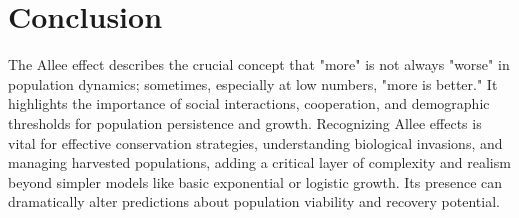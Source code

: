 \documentclass{article}
\begin{document}
\section{Conclusion}

The Allee effect describes the crucial concept that "more" is not always "worse" in population dynamics; sometimes, especially at low numbers, "more is better." It highlights the importance of social interactions, cooperation, and demographic thresholds for population persistence and growth. Recognizing Allee effects is vital for effective conservation strategies, understanding biological invasions, and managing harvested populations, adding a critical layer of complexity and realism beyond simpler models like basic exponential or logistic growth. Its presence can dramatically alter predictions about population viability and recovery potential.


\printbibliography
\end{document}
